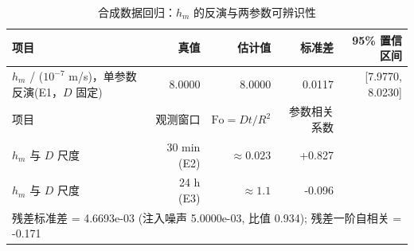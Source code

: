 \begin{table}[H]
\centering
\caption{合成数据回归：$h_m$ 的反演与两参数可辨识性}
\label{tab:inv}
\footnotesize
\begin{tabular}{@{}lrrrr@{}}
\toprule
项目 & 真值 & 估计值 & 标准差 & 95\% 置信区间 \\
\midrule
$h_m$ / ($10^{-7}$ m/s)，单参数反演(E1，$D$ 固定) & 8.0000 & 8.0000 & 0.0117 & [7.9770, 8.0230] \\
\midrule
项目 & 观测窗口 & $\mathrm{Fo}=Dt/R^2$ & 参数相关系数 & \\
\midrule
$h_m$ 与 $D$ 尺度 & 30 min (E2) & $\approx0.023$ & +0.827 & \\
$h_m$ 与 $D$ 尺度 & 24 h (E3) & $\approx1.1$ & -0.096 & \\
\midrule
\multicolumn{5}{l}{残差标准差 = 4.6693e-03 (注入噪声 5.0000e-03, 比值 0.934); 残差一阶自相关 = -0.171} \\
\bottomrule
\end{tabular}
\end{table}

